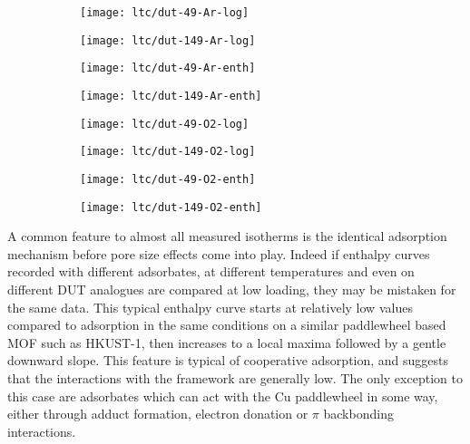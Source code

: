 \begin{figure}[p]
    \centering

    \begin{subfigure}{0.43\linewidth}
        \texttt{[image: ltc/dut-49-Ar-log]}%
    \end{subfigure}%
    \begin{subfigure}{0.43\linewidth}
        \texttt{[image: ltc/dut-149-Ar-log]}%
    \end{subfigure}%

    \begin{subfigure}{0.43\linewidth}
        \texttt{[image: ltc/dut-49-Ar-enth]}%
    \end{subfigure}%
    \begin{subfigure}{0.43\linewidth}
        \texttt{[image: ltc/dut-149-Ar-enth]}%
    \end{subfigure}%

    \begin{subfigure}{0.43\linewidth}
        \texttt{[image: ltc/dut-49-O2-log]}%
    \end{subfigure}%
    \begin{subfigure}{0.43\linewidth}
        \texttt{[image: ltc/dut-149-O2-log]}%
    \end{subfigure}%

    \begin{subfigure}{0.43\linewidth}
        \texttt{[image: ltc/dut-49-O2-enth]}%
    \end{subfigure}%
    \begin{subfigure}{0.43\linewidth}
        \texttt{[image: ltc/dut-149-O2-enth]}%
    \end{subfigure}%

    \caption{}%
    \label{dut:fgr:dut-ltc-comp2}
\end{figure}

A common feature to almost all measured isotherms is the identical
adsorption mechanism before pore size effects come into play.
Indeed if enthalpy curves recorded with different adsorbates, at different
temperatures and even on different DUT analogues are compared at low 
loading, they may be mistaken for the same data.
This typical enthalpy curve starts at relatively low values compared 
to adsorption in the same conditions on a similar paddlewheel based 
MOF such as HKUST-1, then increases to a local maxima followed
by a gentle downward slope.
This feature is typical of cooperative adsorption, and suggests that
the interactions with the framework are generally low. The only 
exception to this case are adsorbates which can act with the 
Cu paddlewheel in some way, either through adduct formation, 
electron donation or \(\pi\) backbonding interactions. 


